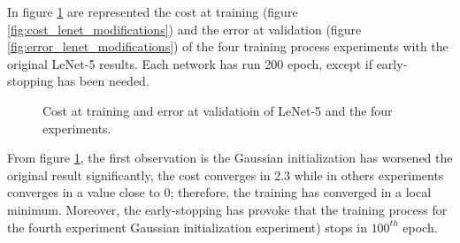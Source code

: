
In figure \ref{fig:LenetModifications} are represented the cost at training (figure \ref{fig:cost_lenet_modifications}) and the error at validation (figure \ref{fig:error_lenet_modifications}) of the four training process experiments  with the original LeNet-5 results. Each network has run 200 epoch, except if early-stopping has been needed.\\

\begin{figure}[tb]    \centering
    \caption{Cost at training and error at validatioin of LeNet-5 and the four experiments.} \label{fig:LenetModifications}
\end{figure}

From figure \ref{fig:LenetModifications}, the first observation is the Gaussian initialization has worsened the original result significantly, the cost converges in 2.3 while in others experiments converges in a value close to 0; therefore, the training has converged in a local minimum. Moreover, the early-stopping has provoke that the training process for the fourth experiment Gaussian initialization experiment) stops in $100^{th}$ epoch.\\

